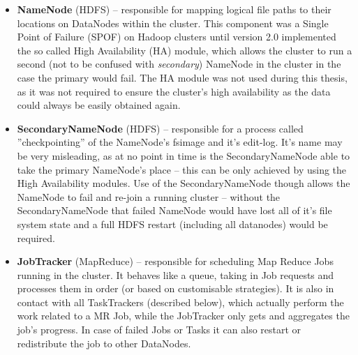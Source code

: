 \begin{itemize}
  \item \textbf{NameNode} (HDFS) -- responsible for mapping logical file paths to their locations on DataNodes within 
                                    the cluster. This component was a Single Point of Failure (SPOF) on Hadoop clusters 
                                    until version 2.0 implemented the so called High Availability (HA) module, which 
                                    allows the cluster to run a second (not to be confused with \textit{secondary}) 
                                    NameNode in the cluster in the case the primary would fail. The HA module was not 
                                    used during this thesis, as it was not required to ensure the cluster's high 
                                    availability as the data could always be easily obtained again.
  \item \textbf{SecondaryNameNode} (HDFS) -- responsible for a process called ''checkpointing'' of the NameNode's 
                                            fsimage and it's edit-log. It's name may be very misleading, as at no point
                                            in time is the SecondaryNameNode able to take the primary NameNode's place -- 
                                            this can be only achieved by using the High Availability modules. Use of the 
                                            SecondaryNameNode though allows the NameNode to fail and re-join a running 
                                            cluster -- without the SecondaryNameNode that failed NameNode would have lost 
                                            all of it's file system state and a full HDFS restart (including all 
                                            datanodes) would be required.
  \item \textbf{JobTracker} (MapReduce) -- responsible for scheduling Map Reduce Jobs running in the cluster. It
                                           behaves like a queue, taking in Job requests and processes them in order (or    
                                           based on customisable strategies). It is also in contact with all TaskTrackers 
                                           (described below), which actually perform the work related to a MR Job, while 
                                           the JobTracker only gets and aggregates the job's progress. In case of failed 
                                           Jobs or Tasks it can also restart or redistribute the job to other DataNodes.
\end{itemize}


